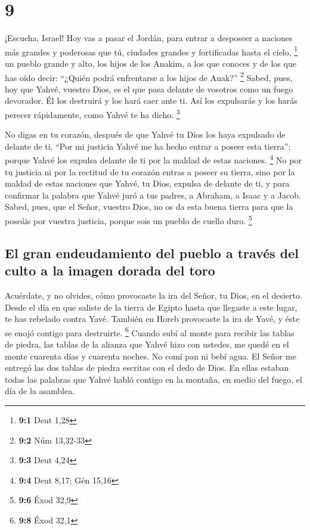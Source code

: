 \hypertarget{section-8}{%
\section{9}\label{section-8}}

 ¡Escucha, Israel! Hoy vas a pasar el Jordán, para entrar
a desposeer a naciones más grandes y poderosas que tú, ciudades grandes
y fortificadas hasta el cielo, \footnote{\textbf{9:1} Deut 1,28}
 un pueblo grande y alto, los hijos de los Anakim, a los
que conoces y de los que has oído decir: ``¿Quién podrá enfrentarse a
los hijos de Anak?'' \footnote{\textbf{9:2} Núm 13,32-33} 
Sabed, pues, hoy que Yahvé, vuestro Dios, es el que pasa delante de
vosotros como un fuego devorador. Él los destruirá y los hará caer ante
ti. Así los expulsarás y los harás perecer rápidamente, como Yahvé te ha
dicho. \footnote{\textbf{9:3} Deut 4,24}

 No digas en tu corazón, después de que Yahvé tu Dios los
haya expulsado de delante de ti, ``Por mi justicia Yahvé me ha hecho
entrar a poseer esta tierra''; porque Yahvé los expulsa delante de ti
por la maldad de estas naciones. \footnote{\textbf{9:4} Deut 8,17; Gén
  15,16}  No por tu justicia ni por la rectitud de tu
corazón entras a poseer su tierra, sino por la maldad de estas naciones
que Yahvé, tu Dios, expulsa de delante de ti, y para confirmar la
palabra que Yahvé juró a tus padres, a Abraham, a Isaac y a Jacob.
 Sabed, pues, que el Señor, vuestro Dios, no os da esta
buena tierra para que la poseáis por vuestra justicia, porque sois un
pueblo de cuello duro. \footnote{\textbf{9:6} Éxod 32,9}

\hypertarget{el-gran-endeudamiento-del-pueblo-a-travuxe9s-del-culto-a-la-imagen-dorada-del-toro}{%
\subsection{El gran endeudamiento del pueblo a través del culto a la
imagen dorada del
toro}\label{el-gran-endeudamiento-del-pueblo-a-travuxe9s-del-culto-a-la-imagen-dorada-del-toro}}

 Acuérdate, y no olvides, cómo provocaste la ira del
Señor, tu Dios, en el desierto. Desde el día en que saliste de la tierra
de Egipto hasta que llegaste a este lugar, te has rebelado contra Yavé.
 También en Horeb provocaste la ira de Yavé, y éste se
enojó contigo para destruirte. \footnote{\textbf{9:8} Éxod 32,1}
 Cuando subí al monte para recibir las tablas de piedra,
las tablas de la alianza que Yahvé hizo con ustedes, me quedé en el
monte cuarenta días y cuarenta noches. No comí pan ni bebí agua.
 El Señor me entregó las dos tablas de piedra escritas
con el dedo de Dios. En ellas estaban todas las palabras que Yahvé habló
contigo en la montaña, en medio del fuego, el día de la asamblea.

